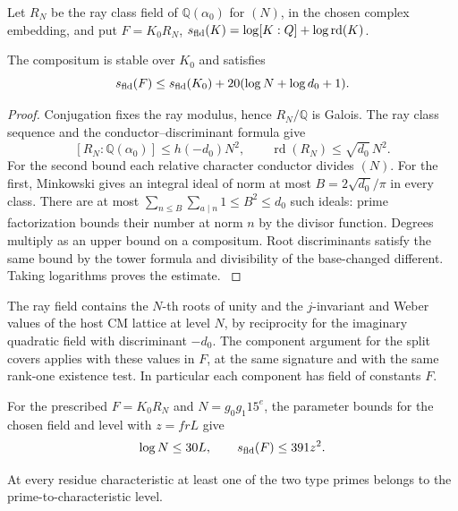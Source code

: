 Let \(R_N\) be the ray class field of \(\mathbb Q(\alpha_0)\)
for \((N)\), in the chosen complex embedding, and put
\(F=K_0R_N\), \(s_{\rm fld}(K)=\log[K:\mathbb Q]+\log\operatorname{rd}(K)\).

\begin{lemma}
The compositum is stable over \(K_0\) and satisfies
\[
  s_{\rm fld}(F)\le s_{\rm fld}(K_0)+20(\log N+\log d_0+1).
\]
\end{lemma}
\begin{proof}
Conjugation fixes the ray modulus, hence \(R_N/\mathbb Q\) is
Galois. The ray class sequence and the conductor--discriminant
formula give
\[
 [R_N:\mathbb Q(\alpha_0)]\le h(-d_0)N^2,\qquad
 \operatorname{rd}(R_N)\le\sqrt{d_0}\,N^2 .
\]
For the second bound each relative character conductor divides
\((N)\). For the first, Minkowski gives an integral ideal of
norm at most \(B=2\sqrt{d_0}/\pi\) in every class. There are at most
\(\sum_{n\le B}\sum_{a\mid n}1\le B^2\le d_0\) such ideals:
prime factorization bounds their number at norm \(n\) by the
divisor function. Degrees multiply as an upper bound on a
compositum. Root discriminants satisfy the same bound by the
tower formula and divisibility of the base-changed different.
Taking logarithms proves the estimate. \label{cor:deep-cover-on-core-3}
\end{proof}

The ray field contains the \(N\)-th roots of unity and the
\(j\)-invariant and Weber values of the host CM lattice at
level \(N\), by reciprocity for the imaginary quadratic
field with discriminant \(-d_0\). The component argument for
the split covers applies with these values in \(F\), at the
same signature and with the same rank-one existence test.
In particular each component has field of constants \(F\).
\label{cor:deep-cover-on-core-4}

\begin{lemma}\label{lem:deep-cover-field-size}
For the prescribed \(F=K_0R_N\) and \(N=g_0g_1 15^e\),
the parameter bounds for the chosen field and level with \(z=frL\) give
\[
 \log N\le30L,\qquad s_{\rm fld}(F)\le391z^2.
\]

At every residue characteristic at least one of the two
type primes belongs to the prime-to-characteristic level.
\end{lemma}

